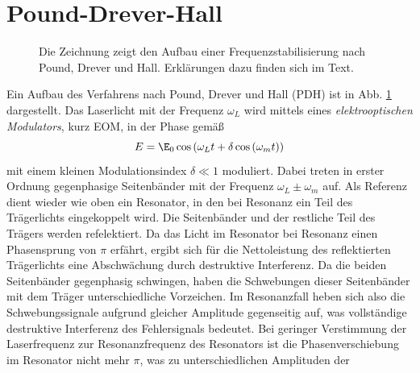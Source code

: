 \section{Pound-Drever-Hall}\label{sec:pound-drever-hall}
\begin{figure}[h]
 	\centering
	\caption[Pound-Drever-Hall - Aufbau]{Die Zeichnung zeigt den Aufbau
	einer Frequenzstabilisierung nach Pound, Drever und Hall. Erklärungen dazu
	finden sich im Text.}\label{fig:pound-drever-hall_aufbau}
\end{figure}
Ein Aufbau des Verfahrens nach Pound, Drever und Hall (PDH) ist in Abb.
\ref{fig:pound-drever-hall_aufbau} dargestellt.
Das Laserlicht mit der Frequenz $\omega_L$ wird mittels eines \textit{elektrooptischen Modulators}, kurz EOM, in der Phase gemäß
\begin{equation}\label{eq:pound-drever-hall_01}
	E=\E_0\cos{\left(\omega_Lt+\delta\cos{(\omega_mt)}\right)}
\end{equation}
mit einem kleinen Modulationsindex $\delta\ll1$ moduliert. Dabei treten in
erster Ordnung gegenphasige Seitenbänder mit der Frequenz $\omega_L\pm\omega_m$
auf. Als Referenz dient wieder wie oben ein Resonator, in den bei Resonanz ein
Teil des Trägerlichts eingekoppelt wird. Die Seitenbänder und der restliche Teil
des Trägers werden refelektiert. Da das Licht im Resonator bei Resonanz einen
Phasensprung von $\pi$ erfährt, ergibt sich für die Nettoleistung des
reflektierten Trägerlichts eine Abschwächung durch destruktive Interferenz.
Da die beiden Seitenbänder gegenphasig schwingen, haben die Schwebungen dieser
Seitenbänder mit dem Träger unterschiedliche Vorzeichen. Im Resonanzfall heben
sich also die Schwebungssignale aufgrund gleicher Amplitude gegenseitig auf, was
vollständige destruktive Interferenz des Fehlersignals bedeutet. Bei geringer
Verstimmung der Laserfrequenz zur Resonanzfrequenz des Resonators ist die
Phasenverschiebung im Resonator nicht mehr $\pi$, was zu unterschiedlichen Amplituden der
